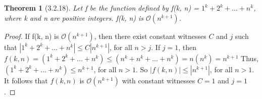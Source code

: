 \documentclass[a4paper, 12pt]{article}
\theoremstyle{plain}
\newtheorem*{theorem*}{Theorem}
\begin{document}
	
	\begin{theorem*}[3.2.18]
		Let f be the function defined by f(k, n) = $1^{k} + 2^{k} + \dots + n^{k}$, where k and n are positive integers. f(k, n) is $\mathcal{O}(n^{k+1})$.
	\end{theorem*}
	
	\begin{proof}
		If f(k, n) is $\mathcal{O}(n^{k+1})$, then there exist constant witnesses $C$ and $j$ such that $|1^{k} + 2^{k} + \dots + n^{k}| \le C|n^{k+1}|$, for all $n > j$. If $j = 1$, then \newline \newline \indent $f(k, n) = \left( 1^{k} + 2^{k} + \dots + n^{k} \right) \le \left( n^{k} + n^{k} + \dots + n^{k} \right) = n(n^{k}) = n^{k+1}$ \newline \newline Thus, $\left( 1^{k} + 2^{k} + \dots + n^{k} \right) \le n^{k+1}$, for all $n > 1$. So $|f(k, n)| \le |n^{k+1}|$, for all $n > 1$. It follows that $f(k, n)$ is $\mathcal{O}(n^{k+1})$ with constant witnesses $C = 1$ and $j = 1$.
	\end{proof}
\end{document}
